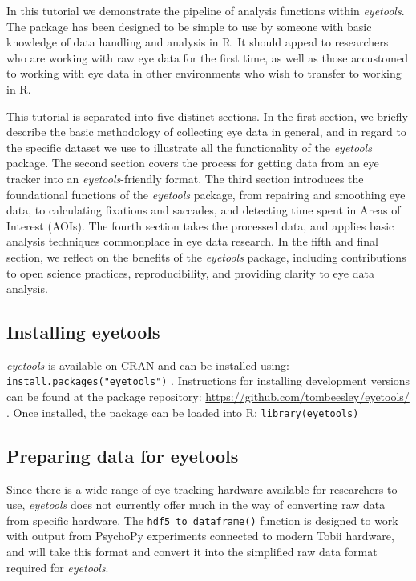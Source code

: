 \documentclass[
  man,
  floatsintext,
  longtable,
  nolmodern,
  notxfonts,
  notimes,
  colorlinks=true,linkcolor=blue,citecolor=blue,urlcolor=blue]{apa7}
\begin{document}
In this tutorial we demonstrate the pipeline of analysis functions
within \emph{eyetools}. The package has been designed to be simple to
use by someone with basic knowledge of data handling and analysis in R.
It should appeal to researchers who are working with raw eye data for
the first time, as well as those accustomed to working with eye data in
other environments who wish to transfer to working in R.

This tutorial is separated into five distinct sections. In the first
section, we briefly describe the basic methodology of collecting eye
data in general, and in regard to the specific dataset we use to
illustrate all the functionality of the \emph{eyetools} package. The
second section covers the process for getting data from an eye tracker
into an \emph{eyetools}-friendly format. The third section introduces
the foundational functions of the \emph{eyetools} package, from
repairing and smoothing eye data, to calculating fixations and saccades,
and detecting time spent in Areas of Interest (AOIs). The fourth section
takes the processed data, and applies basic analysis techniques
commonplace in eye data research. In the fifth and final section, we
reflect on the benefits of the \emph{eyetools} package, including
contributions to open science practices, reproducibility, and providing
clarity to eye data analysis.

\subsection{Installing eyetools}\label{installing-eyetools}

\emph{eyetools} is available on CRAN and can be installed using:
\texttt{install.packages("eyetools")} . Instructions for installing
development versions can be found at the package repository:
\url{https://github.com/tombeesley/eyetools/} . Once installed, the
package can be loaded into R: \texttt{library(eyetools)}

\subsection{Preparing data for
eyetools}\label{preparing-data-for-eyetools}

Since there is a wide range of eye tracking hardware available for
researchers to use, \emph{eyetools} does not currently offer much in the
way of converting raw data from specific hardware. The
\texttt{hdf5\_to\_dataframe()} function is designed to work with output
from PsychoPy experiments connected to modern Tobii hardware, and will
take this format and convert it into the simplified raw data format
required for \emph{eyetools}.
\end{document}
